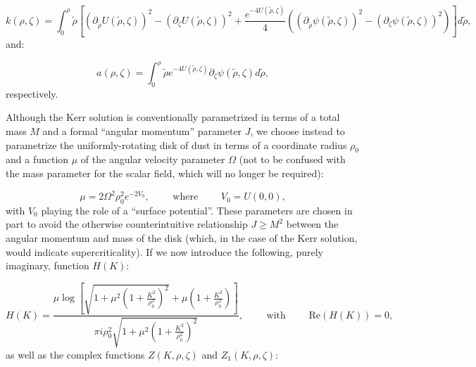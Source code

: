 \documentclass{article}
\begin{document}
\begin{equation}
k \left( \rho, \zeta \right) = \int_{0}^{\rho} \tilde{\rho} \left[ \left( \partial_{\tilde{\rho}} U \left( \tilde{\rho}, \zeta \right) \right)^2 - \left( \partial_{\zeta} U \left( \tilde{\rho}, \zeta \right) \right)^2 + \frac{e^{-4 U \left( \tilde{\rho}, \zeta \right)}}{4} \left( \left( \partial_{\tilde{\rho}} \psi \left( \tilde{\rho}, \zeta \right) \right)^2 - \left( \partial_{\zeta} \psi \left( \tilde{\rho}, \zeta \right) \right)^2 \right) \right] d \tilde{\rho},
\end{equation}
and:

\begin{equation}
a \left( \rho, \zeta \right) = \int_{0}^{\rho} \tilde{\rho} e^{-4 U \left( \tilde{\rho}, \zeta \right)} \partial_{\zeta} \psi \left( \tilde{\rho}, \zeta \right) d \tilde{\rho},
\end{equation}
respectively.

Although the Kerr solution is conventionally parametrized in terms of a total mass $M$ and a formal ``angular momentum'' parameter $J$, we choose instead to parametrize the uniformly-rotating disk of dust in terms of a coordinate radius ${\rho_0}$ and a function ${\mu}$ of the angular velocity parameter ${\Omega}$ (not to be confused with the mass parameter for the scalar field, which will no longer be required):

\begin{equation}
\mu = 2 \Omega^2 \rho_{0}^{2} e^{-2 V_0}, \qquad \text{ where } \qquad V_0 = U \left( 0, 0 \right),
\end{equation}
with ${V_0}$ playing the role of a ``surface potential''. These parameters are chosen in part to avoid the otherwise counterintuitive relationship ${J \geq M^2}$ between the angular momentum and mass of the disk (which, in the case of the Kerr solution, would indicate supercriticality). If we now introduce the following, purely imaginary, function ${H \left( K \right)}$:

\begin{equation}
H \left( K \right) = \frac{\mu \log \left[ \sqrt{1 + \mu^2 \left( 1 + \frac{K^2}{\rho_{0}^{2}} \right)^2} + \mu \left( 1 + \frac{K^2}{\rho_{0}^{2}} \right) \right]}{\pi i \rho_{0}^{2} \sqrt{1 + \mu^2 \left( 1 + \frac{K^2}{\rho_{0}^{2}} \right)^2}}, \qquad \text{ with } \qquad \mathrm{Re} \left( H \left( K \right) \right) = 0,
\end{equation}
as well as the complex functions ${Z \left( K, \rho, \zeta \right)}$ and ${Z_1 \left( K, \rho, \zeta \right)}$:
\end{document}
